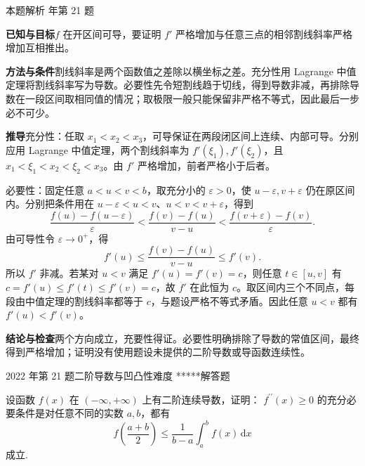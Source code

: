 \documentclass[UTF8,zihao=-4,fontset=fandol]{ctexart}
\newcounter{BankQuestion}
\newcommand{\QuestionPage}[7]{%
  \stepcounter{BankQuestion}%
  \par\noindent\begin{minipage}{\linewidth}
  \raggedright
  {\small\textcolor{black!60}{#3\quad #5\quad 难度 #7}\hfill\textcolor{accent}{#2}}\par\smallskip}
\newcommand{\QuestionEnd}{\end{minipage}\par\medskip}
\newcommand{\QuestionPage}[7]{%
  \clearpage
  \stepcounter{BankQuestion}%
  {\small\textcolor{accent}{#1\hfill #2}}\par\medskip
  {\small\textcolor{black!60}{#3\quad #5\quad 难度 #7\hfill \arabic{BankQuestion} / 234}}\par\vspace{9bp}}
\newcommand{\QuestionEnd}{}
\newenvironment{QuestionSolution}[1]{%
  \clearpage
  {\small\textcolor{black!60}{本题解析\quad #1}}\par\medskip
}{\par\clearpage}
\begin{document}
\begin{QuestionSolution}{2025 年第 21 题}
\textbf{已知与目标}\quad \(f\) 在开区间可导，要证明 \(f'\) 严格增加与任意三点的相邻割线斜率严格增加互相推出。

\textbf{方法与条件}\quad 割线斜率是两个函数值之差除以横坐标之差。充分性用 Lagrange 中值定理将割线斜率写为导数。必要性先令短割线趋于切线，得到导数非减，再排除导数在一段区间取相同值的情况；取极限一般只能保留非严格不等式，因此最后一步必不可少。

\textbf{推导}\quad 充分性：任取 \(x_1<x_2<x_3\)，可导保证在两段闭区间上连续、内部可导。分别应用 Lagrange 中值定理，两个割线斜率为 \(f'(\xi_1),f'(\xi_2)\)，且 \(x_1<\xi_1<x_2<\xi_2<x_3\)。由 \(f'\) 严格增加，前者严格小于后者。

必要性：固定任意 \(a<u<v<b\)，取充分小的 \(\varepsilon>0\)，使 \(u-\varepsilon,v+\varepsilon\) 仍在原区间内。分别把条件用在 \(u-\varepsilon<u<v\)、\(u<v<v+\varepsilon\)，得到
\[\frac{f(u)-f(u-\varepsilon)}\varepsilon<\frac{f(v)-f(u)}{v-u}<\frac{f(v+\varepsilon)-f(v)}\varepsilon.\]
由可导性令 \(\varepsilon\to0^+\)，得
\[
f'(u)\le\frac{f(v)-f(u)}{v-u}\le f'(v).
\]
所以 \(f'\) 非减。若某对 \(u<v\) 满足 \(f'(u)=f'(v)=c\)，则任意 \(t\in[u,v]\) 有 \(c=f'(u)\le f'(t)\le f'(v)=c\)，故 \(f'\) 在此恒为 \(c\)。取区间内三个不同点，每段由中值定理的割线斜率都等于 \(c\)，与题设严格不等式矛盾。因此任意 \(u<v\) 都有 \(f'(u)<f'(v)\)。

\textbf{结论与检查}\quad 两个方向成立，充要性得证。必要性明确排除了导数的常值区间，最终得到严格增加；证明没有使用题设未提供的二阶导数或导函数连续性。
\end{QuestionSolution}

\QuestionPage{2.6 函数性态的研究}{解答题}{2022 年第 21 题}{4}{二阶导数与凹凸性}{128 / 234}{*****}
设函数 \(f\left( x \right)\) 在 \(\left( -\infty,+\infty \right)\) 上有二阶连续导数，证明：
\(f^{\prime\prime}\left( x \right) \ge 0\)
的充分必要条件是对任意不同的实数 \(a,b\)，都有
\[f\left( \frac{a+b}{2} \right) \le \frac{1}{b-a}\int_{a}^{b} f\left( x \right) \,\mathrm{d}x\]
成立.
\QuestionEnd
\end{document}
